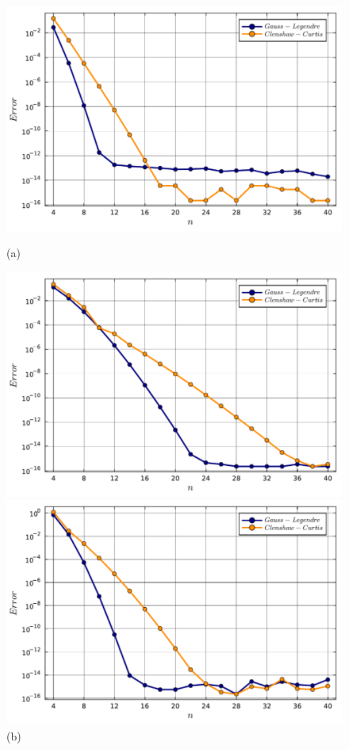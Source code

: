 \documentclass[letterpaper, 12pt]{article}
\begin{document}
\begin{figure}[!ht]
    \centering
    \begin{minipage}[b]{0.47\textwidth}
        \includegraphics[width=\textwidth]{5411.pdf}
        \caption*{(a)}
    \end{minipage}
    \hspace{0.5cm}
    \begin{minipage}[b]{0.47\textwidth}
        \includegraphics[width=\textwidth]{5412.pdf}
        \caption*{(b)}
    \end{minipage}
    \begin{minipage}[b]{0.47\textwidth}
        \includegraphics[width=\textwidth]{5415.pdf}

\end{minipage}
\end{figure}
\end{document}
